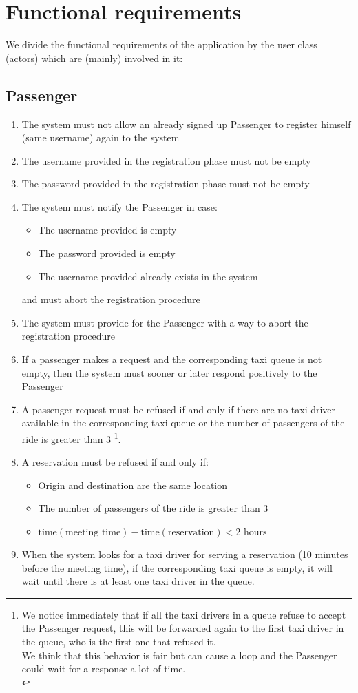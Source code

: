 \pagebreak
\section{Functional requirements}
We divide the functional requirements of the application by the user class (actors) which are (mainly) involved in it:
\subsection{Passenger}
\begin{enumerate}
\item The system must not allow an already signed up Passenger to register himself (same username) again to the system
\item The username provided in the registration phase must not be empty
\item The password provided in the registration phase must not be empty
\item The system must notify the Passenger in case: 
	\begin{itemize}
	\item The username provided is empty
	\item The password provided is empty
	\item The username provided already exists in the system
	\end{itemize}
	and must abort the registration procedure
\item The system must provide for the Passenger with a way to abort the registration procedure
\item If a passenger makes a request and the corresponding taxi queue is not empty, then the system must sooner or later respond positively to the Passenger
\item A passenger request must be refused if and only if there are no taxi driver available in the corresponding taxi queue or the number of passengers of the ride is greater than 3 \footnote{We notice immediately that if all the taxi drivers in a queue refuse to accept the Passenger request, this will be forwarded again to the first taxi driver in the queue, who is the first one that refused it.
	\\ We think that this behavior is fair but can cause a loop and the Passenger could wait for a response a lot of time.\\}.
\item A reservation must be refused if and only if:
\begin{itemize}
	\item Origin and destination are the same location
	\item The number of passengers of the ride is greater than 3
	\item $\text{time}(\text{meeting time}) - \text{time}(\text{reservation}) < \text{2 hours}$
\end{itemize}
\item When the system looks for a taxi driver for serving a reservation (10 minutes before the meeting time), if the corresponding taxi queue is empty, it will wait until there is at least one taxi driver in the queue.
\end{enumerate}


